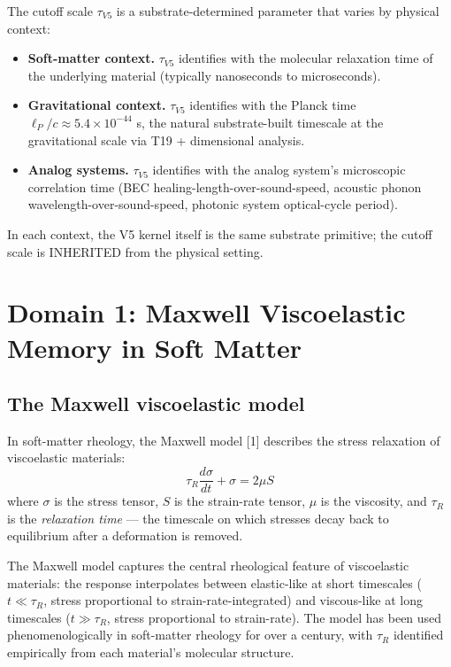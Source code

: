 \documentclass[11pt,a4paper]{article}
\begin{document}
The cutoff scale $\tau_{V5}$ is a substrate-determined parameter that varies by physical context:
\begin{itemize}[noitemsep]
\item \textbf{Soft-matter context.} $\tau_{V5}$ identifies with the molecular relaxation time of the underlying material (typically nanoseconds to microseconds).
\item \textbf{Gravitational context.} $\tau_{V5}$ identifies with the Planck time $\ell_P/c \approx 5.4 \times 10^{-44}$ s, the natural substrate-built timescale at the gravitational scale via T19 + dimensional analysis.
\item \textbf{Analog systems.} $\tau_{V5}$ identifies with the analog system's microscopic correlation time (BEC healing-length-over-sound-speed, acoustic phonon wavelength-over-sound-speed, photonic system optical-cycle period).
\end{itemize}

In each context, the V5 kernel itself is the same substrate primitive; the cutoff scale is INHERITED from the physical setting.

\section{Domain 1: Maxwell Viscoelastic Memory in Soft Matter}

\subsection{The Maxwell viscoelastic model}

In soft-matter rheology, the Maxwell model [1] describes the stress relaxation of viscoelastic materials:
\[
\tau_R \frac{d\sigma}{dt} + \sigma = 2\mu S
\]
where $\sigma$ is the stress tensor, $S$ is the strain-rate tensor, $\mu$ is the viscosity, and $\tau_R$ is the \emph{relaxation time} --- the timescale on which stresses decay back to equilibrium after a deformation is removed.

The Maxwell model captures the central rheological feature of viscoelastic materials: the response interpolates between elastic-like at short timescales ($t \ll \tau_R$, stress proportional to strain-rate-integrated) and viscous-like at long timescales ($t \gg \tau_R$, stress proportional to strain-rate). The model has been used phenomenologically in soft-matter rheology for over a century, with $\tau_R$ identified empirically from each material's molecular structure.
\end{document}
